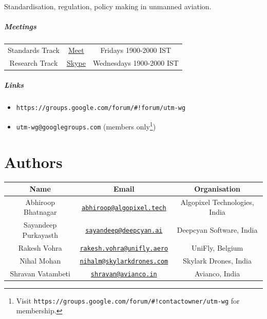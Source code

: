 \documentclass{ua_wgs_base}
\begin{document}
Standardisation, regulation, policy making in unmanned aviation. 

\paragraph*{Meetings}
\begin{center}
\begin{tabular}{|c|c|c|}
\hline 
Standards Track & \href{https://meet.google.com/urz-pekp-rwr}{Meet} & Fridays 1900-2000 IST\tabularnewline
Research Track & \href{https://join.skype.com/RkNeUB8wNvzx}{Skype} & Wednesdays 1900-2000 IST\tabularnewline
\hline 
\end{tabular}
\par\end{center}

\paragraph*{Links}
\begin{itemize}
\item \texttt{https://groups.google.com/forum/\#!forum/utm-wg}
\item \texttt{utm-wg@googlegroups.com} (members only\footnote{Visit \texttt{https://groups.google.com/forum/\#!contactowner/utm-wg}
for membership.})
\end{itemize}

\chapter*{Authors\label{sec:authors}}

\begin{center}
\begin{tabular}{|c|c|c|}
\hline 
\textbf{Name} & \textbf{Email} & \textbf{Organisation}\tabularnewline
\hline 
Abhiroop Bhatnagar\footnotemark & \texttt{\href{mailto:abhiroop@algopixel.tech}{abhiroop@algopixel.tech}} & Algopixel Technologies, India\tabularnewline
Sayandeep Purkayasth\footnotemark[\value{footnote}] & \texttt{\href{mailto:sayandeep@deepcyan.ai}{sayandeep@deepcyan.ai}} & Deepcyan Software, India\tabularnewline
Rakesh Vohra & \texttt{\href{mailto:rakesh.vohra@unifly.aero}{rakesh.vohra@unifly.aero}} & UniFly, Belgium\tabularnewline
Nihal Mohan & \texttt{\href{mailto:nihalm@skylarkdrones.com}{nihalm@skylarkdrones.com}} & Skylark Drones, India\tabularnewline
Shravan Vatambeti & \texttt{\href{mailto:shravan@avianco.in}{shravan@avianco.in}} & Avianco, India\tabularnewline
\hline 
\end{tabular}
\par\end{center}
\end{document}
